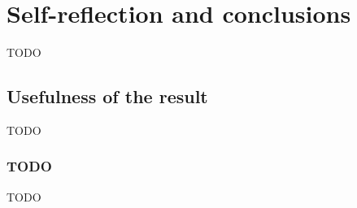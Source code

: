 



\chapter{Self-reflection and conclusions}
\label{ch:discussion}
TODO

\section{Usefulness of the result }
\label{sec:conclusion_usefulness}
TODO


\subsection{TODO}
\label{subsec:conclusion_usefulness_XXX}
TODO

